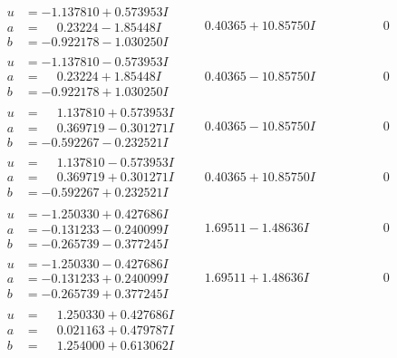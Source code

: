 \documentclass[1p]{elsarticle_modified}
\theoremstyle{definition}
\begin{document}
$$\begin{array}{c|c|c}
\begin{aligned}
u &= -1.137810 + 0.573953 I \\
a &= \phantom{-}0.23224 - 1.85448 I \\
b &= -0.922178 - 1.030250 I\end{aligned}
 & \phantom{-}0.40365 + 10.85750 I & \phantom{-0.000000 } 0 \\ \hline\begin{aligned}
u &= -1.137810 - 0.573953 I \\
a &= \phantom{-}0.23224 + 1.85448 I \\
b &= -0.922178 + 1.030250 I\end{aligned}
 & \phantom{-}0.40365 - 10.85750 I & \phantom{-0.000000 } 0 \\ \hline\begin{aligned}
u &= \phantom{-}1.137810 + 0.573953 I \\
a &= \phantom{-}0.369719 - 0.301271 I \\
b &= -0.592267 - 0.232521 I\end{aligned}
 & \phantom{-}0.40365 - 10.85750 I & \phantom{-0.000000 } 0 \\ \hline\begin{aligned}
u &= \phantom{-}1.137810 - 0.573953 I \\
a &= \phantom{-}0.369719 + 0.301271 I \\
b &= -0.592267 + 0.232521 I\end{aligned}
 & \phantom{-}0.40365 + 10.85750 I & \phantom{-0.000000 } 0 \\ \hline\begin{aligned}
u &= -1.250330 + 0.427686 I \\
a &= -0.131233 - 0.240099 I \\
b &= -0.265739 - 0.377245 I\end{aligned}
 & \phantom{-}1.69511 - 1.48636 I & \phantom{-0.000000 } 0 \\ \hline\begin{aligned}
u &= -1.250330 - 0.427686 I \\
a &= -0.131233 + 0.240099 I \\
b &= -0.265739 + 0.377245 I\end{aligned}
 & \phantom{-}1.69511 + 1.48636 I & \phantom{-0.000000 } 0 \\ \hline\begin{aligned}
u &= \phantom{-}1.250330 + 0.427686 I \\
a &= \phantom{-}0.021163 + 0.479787 I \\
b &= \phantom{-}1.254000 + 0.613062 I\end{aligned}

\end{array}$$
\end{document}

